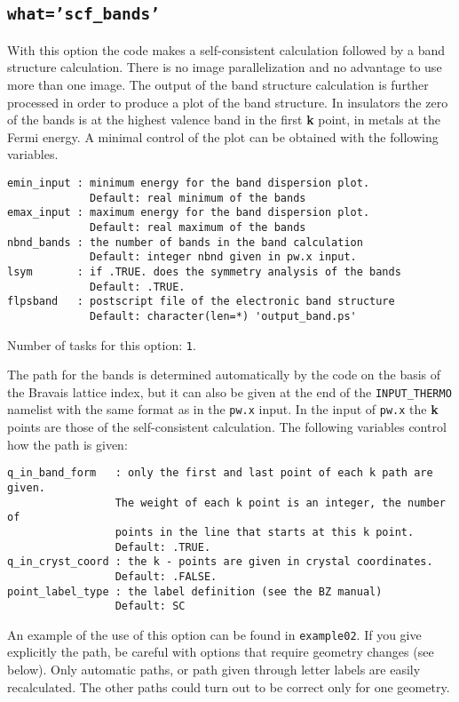 \documentclass[12pt,a4paper]{article}
\begin{document}
\subsection{\texttt{what='scf\_bands'}}
With this option the code makes a self-consistent calculation followed 
by a band structure calculation. There is no image parallelization and no
advantage to use more than one image. The output of the band structure 
calculation is further processed in order to produce a plot of the band 
structure.
In insulators the zero of the bands is at the highest valence band in the
first {\bf k} point, in metals at the Fermi energy. 
A minimal control of the plot can be obtained with the following variables.

\begin{verbatim}
emin_input : minimum energy for the band dispersion plot.
             Default: real minimum of the bands
emax_input : maximum energy for the band dispersion plot.
             Default: real maximum of the bands
nbnd_bands : the number of bands in the band calculation
             Default: integer nbnd given in pw.x input.
lsym       : if .TRUE. does the symmetry analysis of the bands
             Default: .TRUE.
flpsband   : postscript file of the electronic band structure
             Default: character(len=*) 'output_band.ps'
\end{verbatim}
Number of tasks for this option: \texttt{1}.

The path for the bands is determined automatically by the code on the basis
of the Bravais lattice index, but it can also be given at the end of
the \texttt{INPUT\_THERMO} namelist with the same format as in the \texttt{pw.x}
input. In the input of \texttt{pw.x} the {\bf k} points are those of the
self-consistent calculation. The following variables control how the path
is given:
\begin{verbatim}
q_in_band_form   : only the first and last point of each k path are given.
                 The weight of each k point is an integer, the number of 
                 points in the line that starts at this k point.
                 Default: .TRUE.
q_in_cryst_coord : the k - points are given in crystal coordinates.
                 Default: .FALSE.
point_label_type : the label definition (see the BZ manual)
                 Default: SC
\end{verbatim}
An example of the use of this option can be found in \texttt{example02}.
If you give explicitly the path, be careful with options that require
geometry changes (see below). Only automatic paths, or path given through 
letter labels are easily recalculated. The other paths could turn out 
to be correct only for one geometry.
\end{document}

